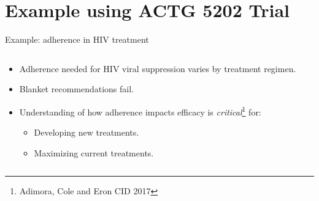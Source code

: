 \documentclass{beamer}
\begin{document}
\section{Example using ACTG 5202 Trial}

\begin{frame}{Example: adherence in HIV treatment}
    \begin{columns}
    \begin{column}{0.45\textwidth}
        \begin{itemize}
            \item Adherence needed for HIV viral suppression varies by treatment regimen.
            \item Blanket recommendations fail.
            \item[\ding{43}] Understanding of how adherence impacts efficacy is \textit{critical}\footnote{\tiny Adimora, Cole and Eron CID 2017} for:
            \begin{itemize}
                \item Developing new treatments.
                \item Maximizing current treatments.
            \end{itemize}
        \end{itemize}
        

\end{column}
\end{columns}
\end{frame}
\end{document}
